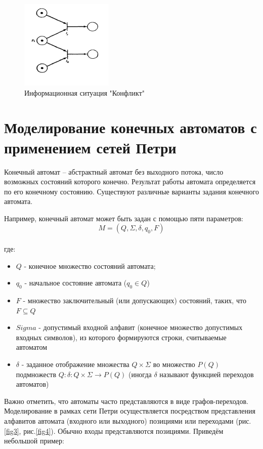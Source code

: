 \begin{figure}[ht]
\centerline{\includegraphics[width=0.3\linewidth]{images/image2.png}}
\caption{Информационная ситуация "Конфликт"}
\label{fig2}
\end{figure}

\section{Моделирование конечных автоматов с применением сетей Петри}

Конечный автомат \cite{Alur} – абстрактный автомат без выходного потока, число возможных состояний которого конечно. Результат работы автомата определяется по его конечному состоянию. Существуют различные варианты задания конечного автомата.

Например, конечный автомат может быть задан с помощью пяти параметров:
\begin{equation}
M = (Q, \Sigma, \delta, q_{0}, F)
\end{equation}
\\где:
\begin{itemize}
  \item $Q$ - конечное множество состояний автомата;
  \item $q_0$ - начальное состояние автомата ($q_0 \in Q$)
  \item $F$ - множество заключительный (или допускающих) состояний, таких, что $F \subseteq Q$
  \item $Sigma$ - допустимый входной алфавит (конечное множество допустимых входных символов), из которого формируются строки, считываемые автоматом
  \item $\delta$ - заданное отображение множества $Q \times \Sigma$ во множество $P(Q)$ подмножеств $Q: \delta : Q \times \Sigma \to P(Q)$ (иногда $\delta$ называют функцией переходов автоматов)
\end{itemize}

Важно отметить, что автоматы часто представляются в виде графов-переходов. Моделирование в рамках сети Петри осуществляется посредством представления алфавитов автомата (входного или выходного) позициями или переходами (рис.\ref{fig3}, рис.\ref{fig4}). Обычно входы представляются позициями. Приведём небольшой пример:

